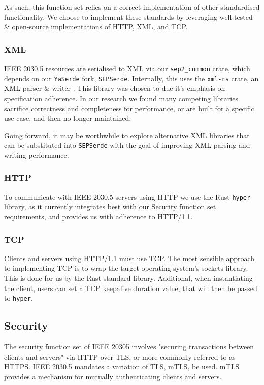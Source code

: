 As such, this function set relies on a correct implementation of other standardised functionality. We choose to implement these standards by leveraging well-tested \& open-source implementations of HTTP, XML, and TCP.

\subsubsection{XML}
IEEE 2030.5 resources are serialised to XML via our \texttt{sep2\_common} crate, which depends on our \texttt{YaSerde} fork, \texttt{SEPSerde}. Internally, this uses the \texttt{xml-rs} crate, an XML parser \& writer \cite{xmlrs}. This library was chosen to due it's emphasis on specification adherence. In our research we found many competing libraries sacrifice correctness and completeness for performance, or are built for a specific use case, and then no longer maintained. \cite{xmlrsperformance}

Going forward, it may be worthwhile to explore alternative XML libraries that can be substituted into \texttt{SEPSerde} with the goal of improving XML parsing and writing performance. 

\subsubsection{HTTP}
To communicate with IEEE 2030.5 servers using HTTP we use the Rust \texttt{hyper} library, as it currently integrates best with our Security function set requirements, and provides us with adherence to HTTP/1.1. \cite{hyper}

\subsubsection{TCP}
Clients and servers using HTTP/1.1 must use TCP. The most sensible approach to implementing TCP is to wrap the target operating system's sockets library. This is done for us by the Rust standard library.
Additional, when instantiating the client, users can set a TCP keepalive duration value, that will then be passed to \texttt{hyper}.

\subsection{Security}
The security function set of IEEE 20305 involves "securing transactions between clients and servers" via HTTP over TLS, or more commonly referred to as HTTPS. IEEE 2030.5 mandates a variation of TLS, mTLS, be used. mTLS provides a mechanism for mutually authenticating clients and servers. 

